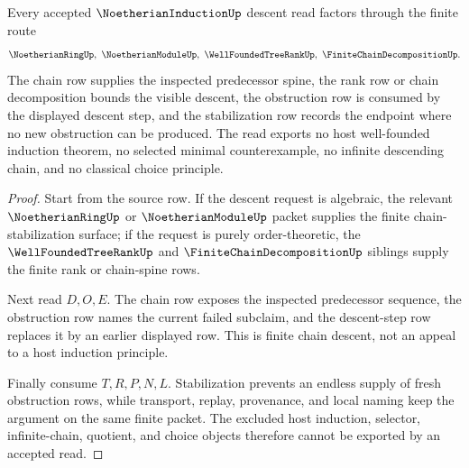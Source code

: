 \begin{theorem}
\label{thm:noetherian-induction-chain-descent}
Every accepted $\NoetherianInductionUp$ descent read factors through the finite route
$$
\NoetherianRingUp,\ \NoetherianModuleUp,\ \WellFoundedTreeRankUp,\ \FiniteChainDecompositionUp .
$$
The chain row supplies the inspected predecessor spine, the rank row or chain decomposition bounds the visible descent, the obstruction row is consumed by the displayed descent step, and the stabilization row records the endpoint where no new obstruction can be produced. The read exports no host well-founded induction theorem, no selected minimal counterexample, no infinite descending chain, and no classical choice principle.
\end{theorem}
\begin{proof}
Start from the source row. If the descent request is algebraic, the relevant $\NoetherianRingUp$ or $\NoetherianModuleUp$ packet supplies the finite chain-stabilization surface; if the request is purely order-theoretic, the $\WellFoundedTreeRankUp$ and $\FiniteChainDecompositionUp$ siblings supply the finite rank or chain-spine rows.

Next read $D,O,E$. The chain row exposes the inspected predecessor sequence, the obstruction row names the current failed subclaim, and the descent-step row replaces it by an earlier displayed row. This is finite chain descent, not an appeal to a host induction principle.

Finally consume $T,R,P,N,L$. Stabilization prevents an endless supply of fresh obstruction rows, while transport, replay, provenance, and local naming keep the argument on the same finite packet. The excluded host induction, selector, infinite-chain, quotient, and choice objects therefore cannot be exported by an accepted read.
\end{proof}



